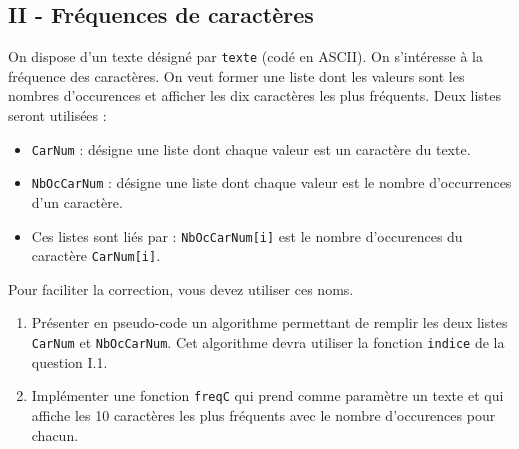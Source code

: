 \subsection*{II - Fréquences de caractères}
On dispose d'un texte désigné par \verb|texte| (codé en ASCII). On s'intéresse à la fréquence des caractères. On veut former une liste dont les valeurs sont les nombres d'occurences et afficher les dix caractères les plus fréquents.\newline
Deux listes seront utilisées :
\begin{itemize}
  \item \verb|CarNum| : désigne une liste dont chaque valeur est un caractère du texte.
  \item \verb|NbOcCarNum| : désigne une liste dont chaque valeur est le nombre d'occurrences d'un caractère.
  \item Ces listes sont liés par : \verb|NbOcCarNum[i]| est le nombre d'occurences du caractère \verb|CarNum[i]|.
\end{itemize}
Pour faciliter la correction, vous devez utiliser ces noms.
\begin{enumerate}
  \item Présenter en pseudo-code un algorithme permettant de remplir les deux listes \verb|CarNum| et \verb|NbOcCarNum|. Cet algorithme devra utiliser la fonction \verb|indice| de la question I.1.
  \item Implémenter une fonction \verb|freqC| qui prend comme paramètre un texte et qui affiche les 10 caractères les plus fréquents avec le nombre d'occurences pour chacun. 
\end{enumerate}

